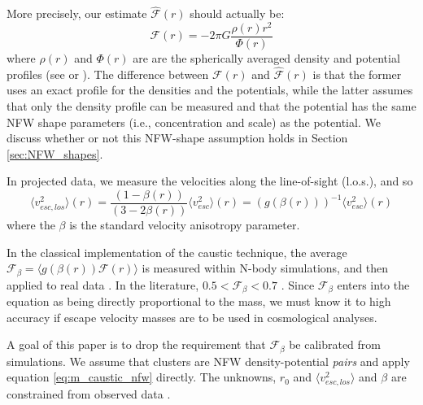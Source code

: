 \documentclass[iop]{emulateapj}
\begin{document}
        More precisely, our estimate $\hat{\mathcal{F}}(r)$ should actually be:
        \begin{equation}
        \mathcal{F}(r) = -2 \pi G \frac{\rho (r) r^2}{\Phi(r)}
        \label{eq:F_r}
        \end{equation}
where $\rho(r)$ and $\Phi(r)$ are are the spherically averaged density and potential profiles (see \citet{Diaferio97} or ). The difference between $\mathcal{F}(r)$ and $\hat{\mathcal{F}}(r)$ is that the former uses an exact profile for the densities and the potentials, while the latter assumes that only the density profile can be measured and that the potential has the same NFW shape parameters (i.e., concentration and scale) as the potential. We discuss whether or not this NFW-shape assumption holds in Section \ref{sec:NFW_shapes}.

         In projected data, we measure the velocities along the line-of-sight (l.o.s.), and so
         \begin{equation}
        \langle v^2_{esc,los}\rangle (r) = \frac{(1-\beta(r))}{(3-2\beta(r))}\langle v_{esc}^2\rangle(r) = (g(\beta(r)))^{-1}\langle v_{esc}^2\rangle(r)
        \label{eq:v_proj}
        \end{equation}
         where the $\beta$ is the standard velocity anisotropy parameter. 
         
         In the classical implementation of the caustic technique,  the average $\mathcal{F}_{\beta} = \langle g(\beta(r)) \mathcal{F}(r) \rangle$ is measured within N-body simulations, and then applied to real data \citep{Rines12,Geller13}.  In the literature, $0.5 < \mathcal{F}_{\beta} < 0.7$ \citep{Diaferio97,Diaferio99,Serra11,Gifford13a}. Since $\mathcal{F}_{\beta}$ enters into the equation as being directly proportional to the mass, we must know it to high accuracy if escape velocity masses are to be used in cosmological analyses.

        A goal of this paper is to drop the requirement that $\mathcal{F}_{\beta}$ be calibrated from simulations. We assume that clusters are NFW density-potential {\it pairs} and apply equation \ref{eq:m_caustic_nfw} directly. The unknowns, $r_0$ and $\langle v^2_{esc,los} \rangle$ and $\beta$ are constrained from observed data \citep{LinMohr04,Carlberg97,Wojtak10,Budzynski12,Diaferio97,Geller13,Rines12,Lemze09,Biviano09,Host09}.
\end{document}
